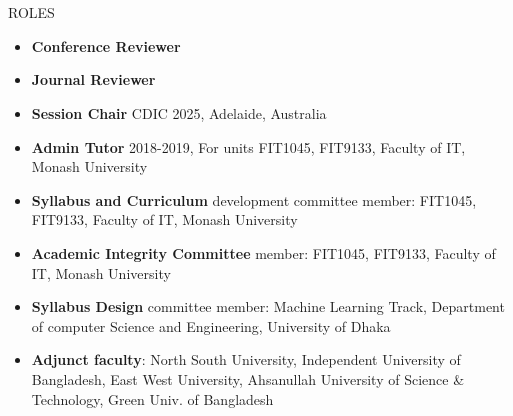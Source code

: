 \section{\faGroup}{ROLES}
\begin{itemize}[noitemsep]
    \item \textbf{Conference Reviewer} 
    \item \textbf{Journal Reviewer} 
    \item \textbf{Session Chair} CDIC 2025, Adelaide, Australia
    \item \textbf{Admin Tutor} 2018-2019, For units FIT1045, FIT9133, Faculty of IT, Monash University
    \item \textbf{Syllabus and Curriculum} development committee member: FIT1045, FIT9133, Faculty of IT, Monash University
    \item \textbf{Academic Integrity Committee} member: FIT1045, FIT9133, Faculty of IT, Monash University
    \item \textbf{Syllabus Design} committee member: Machine Learning Track, Department of computer Science and Engineering, University of Dhaka
    \item \textbf{Adjunct faculty}: North South University, Independent University of Bangladesh, East West University, Ahsanullah University of Science \& Technology, Green Univ. of Bangladesh
\end{itemize}